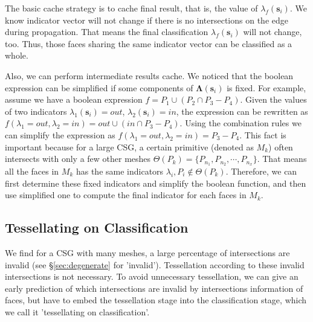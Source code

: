 \documentclass[10pt,journal,compsoc]{IEEEtran}
\begin{document}
The basic cache strategy is to cache final result, that is, the value of $\lambda_f(\bm{s}_i)$. We know indicator vector will not change if there is no intersections on the edge during propagation. That means the final classification $\lambda_f(\bm{s}_i)$ will not change, too. Thus, those faces sharing the same indicator vector can be classified as a whole.

Also, we can perform intermediate results cache. We noticed that the boolean expression can be simplified if some components of $\boldsymbol{\Lambda}(\bm{s}_i)$ is fixed. For example, assume we have a boolean expression $f = P_1\cup (P_2\cap P_3-P_4)$. Given the values of two indicators $\lambda_1(\bm{s}_i)=out$, $\lambda_2(\bm{s}_i)=in$, the expression can be rewritten as $f(\lambda_1=out, \lambda_2=in)=out\cup (in\cap P_3-P_4)$. Using the combination rules we can simplify the expression as $f(\lambda_1=out, \lambda_2=in)=P_3-P_4$. This fact is important because for a large CSG, a certain primitive (denoted as $M_k$) often intersects with only a few other meshes $\Theta(P_k)= \{P_{n_1}, P_{n_2}, \cdots, P_{n_x}\}$. That means all the faces in $M_k$ has the same indicators $\lambda_{i}, P_{i} \notin \Theta(P_k)$. Therefore, we can first determine these fixed indicators and simplify the boolean function, and then use simplified one to compute the final indicator for each faces in $M_k$.



\iffalse
\subsection{Tessellating on Classification}
We find for a CSG with many meshes, a large percentage of intersections are invalid (see \S\ref{sec:degenerate} for 'invalid'). Tessellation according to these invalid intersections is not necessary. To avoid unnecessary tessellation, we can give an early prediction of which intersections are invalid by intersections information of faces, but have to embed the tessellation stage into the classification stage, which we call it 'tessellating on classification'.
\end{document}
